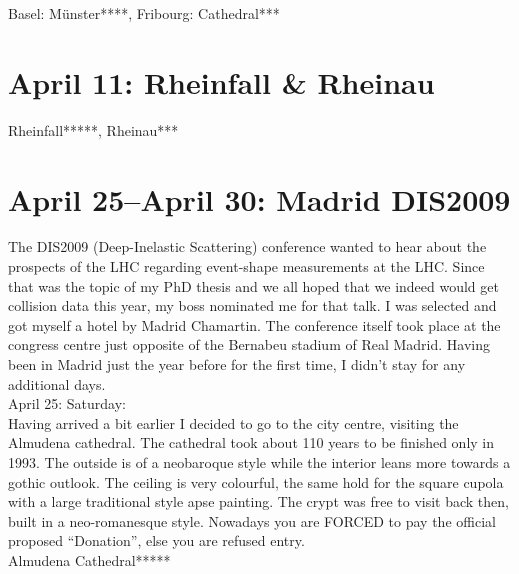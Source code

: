Basel: M\"unster****, Fribourg: Cathedral***

\section{April 11: Rheinfall \& Rheinau}
\label{2009:Rheinfall}

Rheinfall*****, Rheinau***

\section{April 25--April 30: Madrid DIS2009}
\label{2009:Madrid}

The DIS2009 (Deep-Inelastic Scattering) conference wanted to hear about the prospects of the LHC regarding event-shape measurements at the LHC. Since that was the topic of my PhD thesis and we all hoped that we indeed would get collision data this year, my boss nominated me for that talk. I was selected and got myself a hotel by Madrid Chamartin. The conference itself took place at the congress centre just opposite of the Bernabeu stadium of Real Madrid. Having been in Madrid just the year before for the first time, I didn't stay for any additional days.\\

April 25: Saturday:\\
Having arrived a bit earlier I decided to go to the city centre, visiting the Almudena cathedral. The cathedral took about 110 years to be finished only in 1993. The outside is of a neobaroque style while the interior leans more towards a gothic outlook. The ceiling is very colourful, the same hold for the square cupola with a large traditional style apse painting. The crypt was free to visit back then, built in a neo-romanesque style. Nowadays you are FORCED to pay the official proposed ``Donation'', else you are refused entry.\\

Almudena Cathedral*****\\

